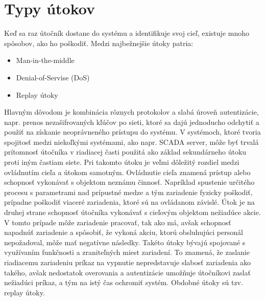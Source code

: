 \section{Typy útokov}
\tab Keď sa raz útočník dostane do systému a identifikuje svoj cieľ, existuje mnoho spôsobov, ako ho poškodiť. Medzi najbežnejšie útoky patria:
\begin{itemize}
\item Man-in-the-middle
\item Denial-of-Servise (DoS)
\item Replay útoky
\end{itemize}
Hlavným dôvodom je kombinácia rôznych protokolov a slabá úroveň autentizácie, napr. prenos nezašifrovaných kľúčov po sieti, ktoré sa dajú jednoducho odchytiť a použiť na získanie neoprávneného prístupu do systému. V systémoch, ktoré tvoria spojitosť medzi niekoľkými systémami, ako napr. SCADA server, môže byť trvalá prítomnosť útočníka v riadiacej časti použitá ako základ sekundárneho útoku proti iným častiam siete. Pri takomto útoku je veľmi dôležitý rozdiel medzi ovládnutím cieľa a útokom samotným. Ovládnutie cieľa znamená prístup alebo schopnosť vykonávať s objektom neznámu činnosť. Napríklad spustenie určitého procesu s parametrami nad prípustné medze a tým zariadenie fyzicky poškodiť, prípadne poškodiť viaceré zariadenia, ktoré sú na ovládanom závislé. Útok je na druhej strane schopnosť útočníka vykonávať s cieľovým objektom nežiadúce akcie. V tomto prípade môže zariadenie pracovať, tak ako má, avšak schopnosť napadnúť zariadenie a spôsobiť, že vykoná akciu, ktorú obsluhujúci personál nepožadoval, môže mať negatívne následky. Takéto útoky bývajú spojované s využívaním funkčnosti a zraniteľných miest zariadení. To znamená, že zaslanie riadiacemu zariadeniu príkaz na vypnutie nepredstavuje slabosť zariadenia ako takého, avšak nedostatok overovania a autentizácie umožňuje útočníkovi zaslať nežiadúci príkaz, a tým na istý čas ochromiť systém. Obdobné útoky sú tzv. replay útoky\cite{Security}. \par

